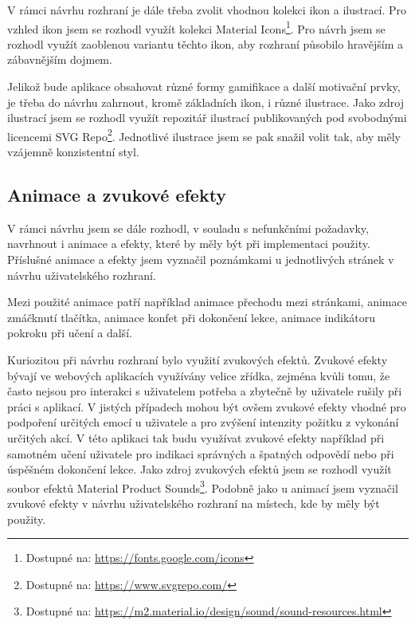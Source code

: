V rámci návrhu rozhraní je dále třeba zvolit vhodnou kolekci ikon a ilustrací. Pro vzhled ikon jsem se rozhodl využít kolekci Material Icons\footnote{Dostupné na: \href{https://fonts.google.com/icons}{https://fonts.google.com/icons}}. Pro návrh jsem se rozhodl využít zaoblenou variantu těchto ikon, aby rozhraní působilo hravějším a zábavnějším dojmem.

Jelikož bude aplikace obsahovat různé formy gamifikace a další motivační prvky, je třeba do návrhu zahrnout, kromě základních ikon, i různé ilustrace. Jako zdroj ilustrací jsem se rozhodl využít repozitář ilustrací publikovaných pod svobodnými licencemi SVG Repo\footnote{Dostupné na: \href{https://www.svgrepo.com/}{https://www.svgrepo.com/}}. Jednotlivé ilustrace jsem se pak snažil volit tak, aby měly vzájemně konzistentní styl.

\subsection{Animace a zvukové efekty}

V rámci návrhu jsem se dále rozhodl, v souladu s nefunkčními požadavky, navrhnout i animace a efekty, které by měly být při implementaci použity. Příslušné animace a efekty jsem vyznačil poznámkami u jednotlivých stránek v návrhu uživatelského rozhraní.

Mezi použité animace patří například animace přechodu mezi stránkami, animace zmáčknutí tlačítka, animace konfet při dokončení lekce, animace indikátoru pokroku při učení a další.

Kuriozitou při návrhu rozhraní bylo využití zvukových efektů. Zvukové efekty bývají ve webových aplikacích využívány velice zřídka, zejména kvůli tomu, že často nejsou pro interakci s uživatelem potřeba a zbytečně by uživatele rušily při práci s aplikací. V jistých případech mohou být ovšem zvukové efekty vhodné pro podpoření určitých emocí u uživatele a pro zvýšení intenzity požitku z vykonání určitých akcí. V této aplikaci tak budu využívat zvukové efekty například při samotném učení uživatele pro indikaci správných a špatných odpovědí nebo při úspěšném dokončení lekce. Jako zdroj zvukových efektů jsem se rozhodl využít soubor efektů Material Product Sounds\footnote{Dostupné na: \href{https://m2.material.io/design/sound/sound-resources.html}{https://m2.material.io/design/sound/sound-resources.html}}. Podobně jako u animací jsem vyznačil zvukové efekty v návrhu uživatelského rozhraní na místech, kde by měly být použity. \cite {MaterialDesign2ApplyingSounds}
